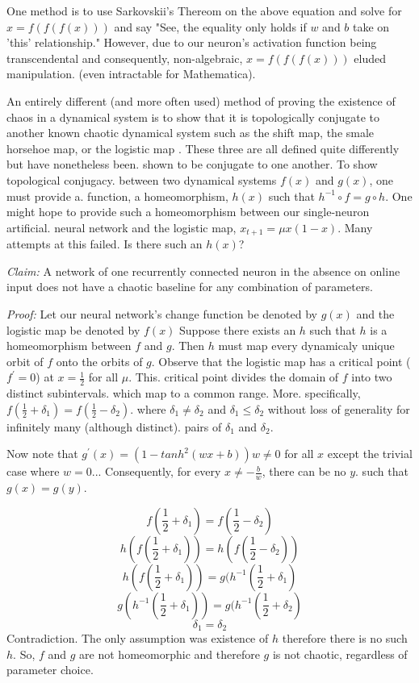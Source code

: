\documentclass[12pt]{article}
\begin{document}
One method is to use 
Sarkovskii's Thereom on the above equation and solve for $x = f(f(f(x)))$ and 
say "See, the equality only holds if $w$ and $b$ take on 'this' relationship."
However, due to our neuron's activation function being transcendental and
consequently, non-algebraic, $x = f(f(f(x)))$ eluded manipulation.
(even intractable for Mathematica).

An entirely different (and more often used) method of proving the existence
of chaos in a dynamical system is to show that it is topologically conjugate
to another known chaotic dynamical system such as the shift map, the smale 
horsehoe map, or the logistic map \cite{devaney, hirsch}.
These three are all defined quite differently but have nonetheless been.
shown to be conjugate to one another.  To show topological conjugacy.
between two dynamical systems $f(x)$ and $g(x)$, one must provide a.
function, a homeomorphism, $h(x)$ such that $h^{-1} \circ f = g \circ h$.
One might hope to provide such a homeomorphism between our 
single-neuron artificial.
neural network and the logistic map, $x_{t+1} = \mu x (1-x)$.  
Many attempts at this failed.  Is there such an $h(x)$?

\textit{Claim:}  A network of one recurrently connected neuron in the
absence on online input does not have a chaotic baseline for any
combination of parameters.

\textit{Proof:}
Let our neural network's change function be denoted by $g(x)$ and the logistic map be denoted by $f(x)$
Suppose there exists an $h$ such that $h$ is a homeomorphism
between $f$ and $g$.  Then $h$ must map every dynamicaly unique
orbit of $f$ onto the orbits of $g$.  Observe that the logistic map has a
critical point ($f^{\prime} = 0$) at $x=\frac{1}{2}$ for all $\mu$.  This.
critical point divides the domain of $f$ into two distinct subintervals.
which map to a common range.  More.
specifically, $f(\frac{1}{2} + \delta_{1}) = f(\frac{1}{2} - \delta_{2})$.
where $\delta_{1} \neq \delta_{2}$ and $\delta_{1} \le \delta_{2}$ without loss of generality for infinitely many (although distinct).
pairs of $\delta_{1}$ and $\delta_{2}$.

Now note that $g^{\prime}(x) = (1 - tanh^{2}(wx+b))w \neq 0$ for all $x$ except the trivial case where $w=0$...
Consequently, for every $x \neq -\frac{b}{w}$, there can be no $y$.
such that $g(x) = g(y)$.

$$f(\frac{1}{2} + \delta_{1}) = f(\frac{1}{2} - \delta_{2})$$
$$h(f(\frac{1}{2} + \delta_{1})) = h(f(\frac{1}{2} - \delta_{2}))$$
$$h(f(\frac{1}{2} + \delta_{1})) = g(h^{-1}(\frac{1}{2} + \delta_{1})$$
$$g(h^{-1}(\frac{1}{2} + \delta_{1})) = g(h^{-1}(\frac{1}{2} + \delta_{2})$$
$$\delta_{1} = \delta_{2}$$
   Contradiction.  The only assumption was existence of $h$ therefore there 
   is no such $h$. So, $f$ and $g$ are not homeomorphic and therefore $g$ 
   is not chaotic, regardless of parameter choice.
\end{document}
